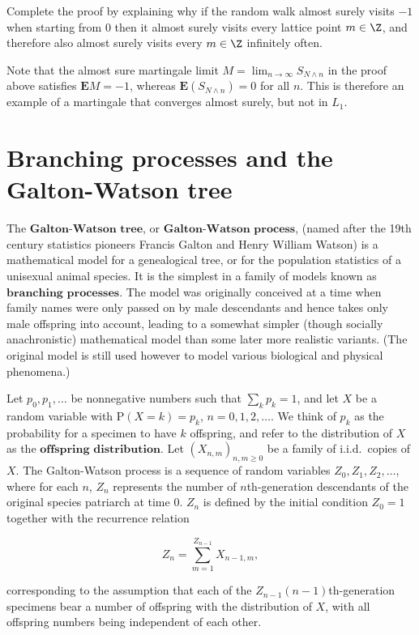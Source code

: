 \begin{xexercise}
Complete the proof by explaining why if the random
walk almost surely visits $-1$ when starting from $0$
then it almost surely visits every lattice point
$m\in\Z$, and therefore also almost surely visits
every $m\in\Z$ infinitely often.
\end{xexercise}

\noindent Note that the almost sure martingale limit
$M=\lim_{n\to\infty} S_{N\wedge n}$ in the proof
above satisfies $\mathbf{E} M=-1$, whereas
$\mathbf{E}(S_{N \wedge n})=0$ for all $n$. This is
therefore an example of a martingale that converges
almost surely, but not in $L_1$.

\section{Branching processes and the Galton-Watson tree}
The $\textbf{Galton-Watson tree}$, or
$\textbf{Galton-Watson process}$, (named after the
19th century statistics pioneers Francis Galton and
Henry William Watson) is a mathematical model for a
genealogical tree, or for the population statistics of
a unisexual animal species. It is the simplest in a
family of models known as
$\textbf{branching processes}$. The model was
originally conceived at a time when family names were
only passed on by male descendants and hence takes
only male offspring into account, leading to a
somewhat simpler (though socially anachronistic)
mathematical model than some later more realistic
variants.  (The original model is still used however
to model various biological and physical phenomena.)

Let $p_0, p_1, \ldots$ be nonnegative numbers such
that $\sum_k p_k = 1$, and let $X$ be a random
variable with $\mathrm{P}(X=k)=p_k$, $n=0,1,2,\ldots$.
We think of $p_k$ as the probability for a specimen
to have $k$ offspring, and refer to the distribution
of $X$ as the $\textbf{offspring distribution}$. Let
$(X_{n,m})_{n,m\ge 0}$ be a family of i.i.d.\ copies
of $X$. The Galton-Watson process is a sequence of
random variables $Z_0, Z_1, Z_2, \ldots$, where for
each $n$, $Z_n$ represents the number of
$n$th-generation descendants of the original species
patriarch at time $0$. $Z_n$ is defined by the
initial condition $Z_0=1$ together with the
recurrence relation

\[
Z_n = \sum_{m=1}^{Z_{n-1}} X_{n-1,m},
\]

\noindent corresponding to the assumption that each of the
$Z_{n-1}$$(n-1)$th-generation specimens bear a
number of offspring with the distribution of $X$,
with all offspring numbers being independent of each
other.

